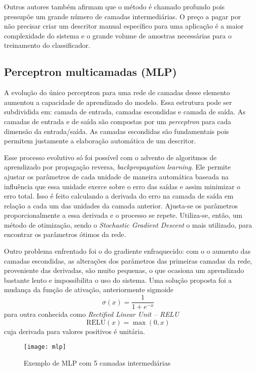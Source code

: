 Outros autores também afirmam que o método é chamado profundo pois pressupõe um grande número de camadas intermediárias. O preço a pagar por não precisar criar um descritor manual específico para uma aplicação é a maior complexidade do sistema e o grande volume de amostras necessárias para o treinamento do classificador.

\subsection{Perceptron multicamadas (MLP)}
A evolução do único perceptron para uma rede de camadas desse elemento aumentou a capacidade de aprendizado do modelo. Essa estrutura pode ser subdividida em: camada de entrada, camadas escondidas e camada de saída. As camadas de entrada e de saída são compostas por um \textit{perceptron} para cada dimensão da entrada/saída. As camadas escondidas são fundamentais pois permitem justamente a elaboração automática de um descritor.

Esse processo evolutivo só foi possível com o advento de algoritmos de aprendizado por propagação reversa, \textit{backpropagation learning}. Ele  permite ajustar os parâmetros de cada unidade de maneira automática baseada na influência que essa unidade exerce sobre o erro das saídas e assim minimizar o erro total. Isso é feito calculando a derivada do erro na camada de saída em relação a cada um das unidades da camada anterior. Ajusta-se os parâmetros proporcionalmente a essa derivada e o processo se repete. Utiliza-se, então, um método de otimização, sendo o \textit{Stochastic Gradient Descent} o mais utilizado, para encontrar os parâmetros ótimos da rede.

Outro problema enfrentado foi o do gradiente enfraquecido: com o o aumento das camadas escondidas, as alterações dos parâmetros das primeiras camadas da rede, proveniente das derivadas, são muito pequenas, o que ocasiona um aprendizado bastante lento e impossibilita o uso do sistema. Uma solução proposta foi a mudança da função de ativação, anteriormente sigmoide
\begin{equation}
	\label{eq:sigm}
	\sigma(x) = \frac{1}{1+e^{-x}}
\end{equation}
para outra conhecida como \textit{Rectified Linear Unit -- RELU}
\begin{equation}
	\label{eq:relu}
	\text{RELU}(x) = \max(0,x)
\end{equation}
cuja derivada para valores positivos é unitária. 

\begin{figure}[h]
\centering
\texttt{[image: mlp]}
\caption{Exemplo de MLP com 5 camadas intermediárias}
\label{fig:mlp}
\end{figure}

